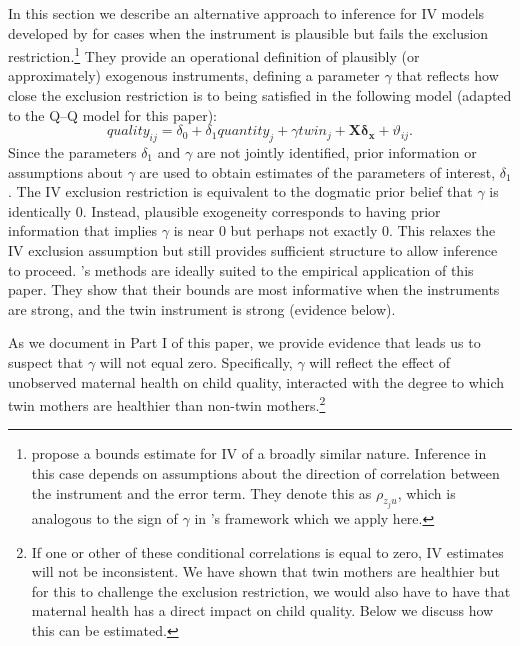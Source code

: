 \documentclass[subeqn]{article}
\begin{document}
\begin{spacing}{1.4}
In this section we describe an alternative approach to inference for IV models developed by \citet{Conleyetal2012} for cases when the instrument is plausible but fails the exclusion restriction.\footnote{\citet{NevoRosen2012} propose a bounds
  estimate for IV of a broadly similar nature.  Inference in this case depends on
  assumptions about the direction of correlation between the instrument and the
  error term. They denote this as $\rho_{z_{j}u}$, which is analogous to the sign
  of $\gamma$ in \citeauthor{Conleyetal2012}'s framework which we apply here.} 
They provide an operational definition of plausibly (or approximately) exogenous instruments, defining a parameter $\gamma$ that reflects how close the exclusion restriction is to
being satisfied in the following model (adapted to the Q--Q model for this paper):
\begin{equation}
  \label{TWINeqn:Conley}
  quality_{ij}=\delta_0 + \delta_1 quantity_j + \gamma twin_j + \bm{X}\bm{\delta_x} + \vartheta_{ij}.
\end{equation}
Since the parameters $\delta_1$ and $\gamma$ are not jointly identified,
prior information or assumptions about $\gamma$ are used
to obtain estimates of the parameters of interest, $\delta_1$. The IV
exclusion restriction is equivalent to the dogmatic prior belief
that $\gamma$ is identically 0. Instead, plausible exogeneity
corresponds to having prior information that implies $\gamma$ is near
0 but perhaps not exactly 0. This relaxes the IV
exclusion assumption but still provides sufficient structure to
allow inference to proceed. \citeauthor{Conleyetal2012}'s methods
are ideally suited to the empirical application of this paper. They
show that their bounds are most informative when the instruments are
strong, and the twin instrument is strong (evidence below).

As we document in Part I of this paper, we provide evidence that leads us to
suspect that $\gamma$ will not equal zero. 
Specifically, $\gamma$ will reflect the effect of unobserved maternal health
on child quality, interacted with the degree to which twin mothers are healthier
than non-twin mothers.\footnote{If one or other of these conditional correlations is equal to zero, IV estimates will not be inconsistent. We have shown that twin mothers are healthier but for this to challenge the exclusion restriction, we would also have to have that maternal health has a direct impact on child quality. Below we discuss how this can be estimated.}


\end{spacing}
\end{document}
